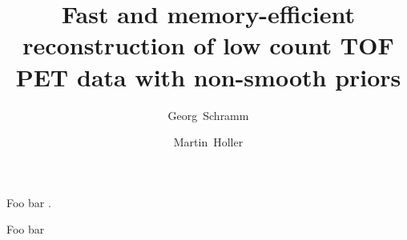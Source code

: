 \documentclass[11pt,twocolumn,twoside]{article}
\begin{document}
\title{Fast and memory-efficient reconstruction of low count TOF PET data with non-smooth priors} 

\author[1]{Georg~Schramm}
\author[2]{Martin~Holler}



\maketitle
\thispagestyle{fancy}





\begin{customabstract}
Foo bar \cite{Chambolle2011,Chambolle2018,Ehrhardt2019}.
\end{customabstract}



Foo bar


\printbibliography
\end{document}
